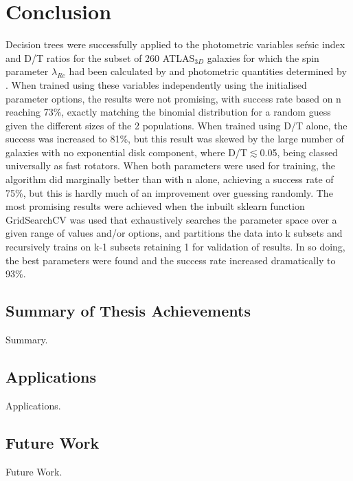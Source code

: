 
\chapter{Conclusion}

\label{ch:conclusions}
Decision trees were successfully applied to the photometric variables se\'rsic index and D/T ratios for the subset of 260 ATLAS$_{3D}$ galaxies for which the spin parameter $\lambda_{Re}$ had been calculated by \cite{Emsellem2011} and photometric quantities determined by \cite{Krajnovic2013}. When trained using these variables independently using the initialised parameter options, the results were not promising, with success rate based on n reaching 73\%, exactly matching the binomial distribution for a random guess given the different sizes of the 2 populations. When trained using D/T alone, the success was increased to 81\%, but this result was skewed by the large number of galaxies with no exponential disk component, where D/T$\lesssim $0.05, being classed universally as fast rotators. When both parameters were used for training, the algorithm did marginally better than with n alone, achieving a success rate of 75\%, but this is hardly much of an improvement over guessing randomly. The most promising results were achieved when the inbuilt sklearn function GridSearchCV was used that exhaustively searches the parameter space over a given range of values and/or options, and partitions the data into k subsets and recursively trains on k-1 subsets retaining 1 for validation of results. In so doing, the best parameters were found and the success rate increased dramatically to 93\%.

\section{Summary of Thesis Achievements}

Summary.


\section{Applications}

Applications.


\section{Future Work}

Future Work.
